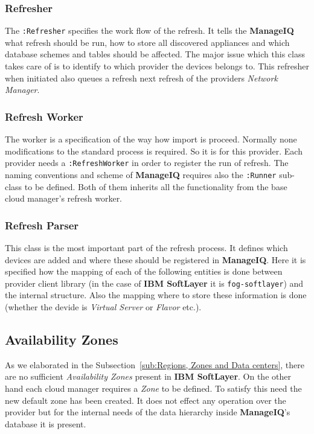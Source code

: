 \subsubsection{Refresher}
\label{subs:Refresher}

The \texttt{:Refresher} specifies the work flow of the refresh. It tells the \textbf{ManageIQ} what refresh should be run, how to store all discovered appliances and which database schemes and tables should be affected. The major issue which this class takes care of is to identify to which provider the devices belongs to. This refresher when initiated also queues a refresh next refresh of the providers \emph{Network Manager}.

\subsubsection{Refresh Worker}
\label{subs:Refresh Worker}

The worker is a specification of the way how import is proceed. Normally none modifications to the standard process is required. So it is for this provider. Each provider needs a \texttt{:RefreshWorker} in order to register the run of refresh. The naming conventions and scheme of \textbf{ManageIQ} requires also the \texttt{:Runner} sub-class to be defined. Both of them inherits all the functionality from the base cloud manager's refresh worker.

\subsubsection{Refresh Parser}
\label{subs:Refresh Parser}

This class is the most important part of the refresh process. It defines which devices are added and where these should be registered in \textbf{ManageIQ}. Here it is specified how the mapping of each of the following entities is done between provider client library (in the case of \textbf{IBM SoftLayer} it is \texttt{fog-softlayer}) and the internal structure. Also the mapping where to store these information is done (whether the devide is \emph{Virtual Server} or \emph{Flavor} etc.).

\subsection{Availability Zones}
\label{sub:Availability Zones}

As we elaborated in the Subsection~\ref{sub:Regions, Zones and Data centers}, there are no sufficient \emph{Availability Zones} present in \textbf{IBM SoftLayer}. On the other hand each cloud manager requires a \emph{Zone} to be defined. To satisfy this need the new default zone has been created. It does not effect any operation over the provider but for the internal needs of the data hierarchy inside \textbf{ManageIQ}'s database it is present.

